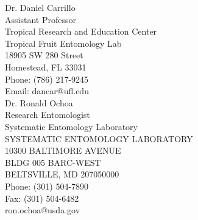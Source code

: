 \documentclass[11pt]{letter} %
\begin{document}
\begin{letter}
Dr. Daniel Carrillo\\
Assistant Professor\\
Tropical Research and Education Center\\
Tropical Fruit Entomology Lab\\
18905 SW 280 Street\\
Homestead, FL 33031\\
Phone: (786) 217-9245\\
Email: dancar@ufl.edu\\

Dr. Ronald Ochoa\\
Research Entomologist\\
Systematic Entomology Laboratory\\
SYSTEMATIC ENTOMOLOGY LABORATORY\\
10300 BALTIMORE AVENUE\\
BLDG 005 BARC-WEST\\
BELTSVILLE, MD 207050000\\
Phone: (301) 504-7890\\
Fax: (301) 504-6482\\
ron.ochoa@usda.gov\\

\thispagestyle{empty}

\end{letter}
\end{document}
